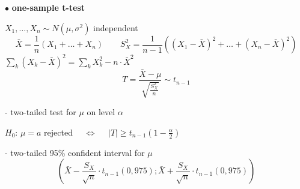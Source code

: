 \documentclass[twoside]{book}
\begin{document}
\pagestyle{empty}

\def\dr #1{\par\noindent $\bullet$ {\bf #1}}



\dr{one-sample t-test}
\vspace*{2mm}
\par $X_{1},\dots,X_{n}\sim N(\mu,\sigma^2)$ independent
$$\bar{X}=\frac1{n}\left(X_1 + \dots + X_{n}\right) \qquad S_{X}^2=\frac1{n-1}\left((X_1-\bar{X})^2 + \dots + (X_{n}-\bar{X})^2\right)$$
$\sum_{k}(X_{k}-\bar{X})^2=   \sum_{k}X_{k}^2- n\cdot \bar{X}^2    $
$$ \qquad T=\frac{\bar{X}-\mu}{\sqrt{\frac{S_{X}^2}{n}}}\sim t_{n-1}\qquad     $$
\par\noindent - two-tailed test for $\mu$ on level $\alpha$
\vspace*{3mm}
\par $H_0$:  $\mu=a$ rejected $\quad\Longleftrightarrow\quad$
     $|T|\geq t_{n-1}(1-\frac{\alpha}2)$
\vspace*{5mm}
\par\noindent - two-tailed 95\% confident interval for $\mu$
  $$\left(\bar{X}-\frac{S_{X}}{\sqrt{n}}\cdot t_{n-1}(0,975);\bar{X}+\frac{S_{X}}{\sqrt{n}}\cdot t_{n-1}(0,975) \right)$$
\end{document}
